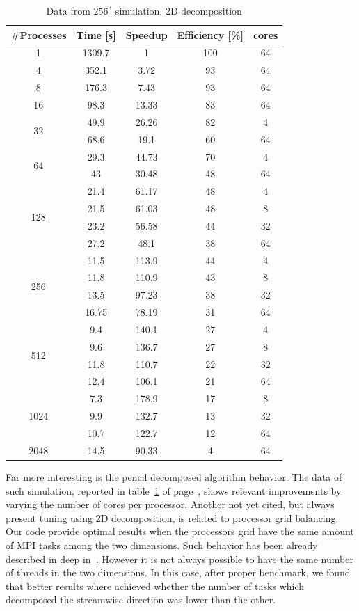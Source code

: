 \begin{table}
\caption{Data from $256^{3}$ simulation, 2D decomposition}
\begin{center}
\begin{tabular}{c c c c c}
\toprule
\textbf{\#Processes} & \textbf{Time [s]} & \textbf{Speedup} & \textbf{Efficiency [\%]} & \textbf{cores}\\
\midrule
1 & 1309.7 & 1 & 100 & 64 \\
4 & 352.1 & 3.72 & 93 & 64\\
8 & 176.3 & 7.43 & 93 & 64\\
16 & 98.3 & 13.33 & 83 & 64\\
\hline
\multirow{2}{*}{32} & 49.9 & 26.26 & 82 & 4\\
& 68.6 & 19.1 & 60 & 64\\
\hline
\multirow{2}{*}{64} & 29.3 & 44.73 & 70 & 4\\ 
 & 43 & 30.48 & 48 & 64\\
\hline
\multirow{4}{*}{128} & 21.4 & 61.17 &  48 & 4\\
& 21.5 & 61.03 & 48 & 8\\
& 23.2 & 56.58 & 44 & 32\\
& 27.2 & 48.1 & 38 & 64\\
\hline
\multirow{4}{*}{256} & 11.5 & 113.9 & 44 & 4\\
& 11.8 & 110.9 & 43 & 8\\
&13.5 & 97.23 & 38 & 32\\
&16.75 & 78.19 & 31 & 64\\
\hline
\multirow{4}{*}{512} & 9.4 & 140.1 & 27 & 4\\
&9.6 & 136.7 & 27 & 8\\
&11.8 & 110.7 & 22 & 32\\
&12.4 & 106.1 & 21 & 64\\
\hline
\multirow{3}{*}{1024} & 7.3 & 178.9 & 17 & 8\\
&9.9 & 132.7 & 13 & 32\\
&10.7 & 122.7 & 12 & 64\\
\hline
2048 & 14.5 & 90.33 & 4 & 64\\
\bottomrule
\end{tabular}
\end{center}
\label{128:data:2}
\end{table}

\par
Far more interesting is the pencil decomposed algorithm behavior. The data of such simulation, reported in table~\ref{128:data:2} of page~\pageref{128:data:2}, shows relevant improvements by varying the number of cores per processor. Another not yet cited, but always present tuning using 2D decomposition, is related to processor grid balancing. Our code provide optimal results when the processors grid have the same amount of MPI tasks among the two dimensions. Such behavior has been already described in deep in~\cite[39]{tesi:brach}. However it is not always possible to have the same number of threads in the two dimensions. In this case, after proper benchmark, we found that better results where achieved whether the number of tasks which decomposed the streamwise direction was lower than the other.
\par

